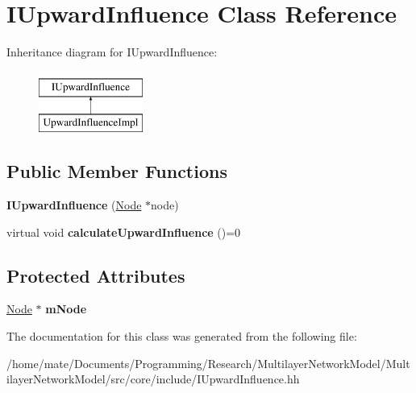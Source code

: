 \hypertarget{classIUpwardInfluence}{}\section{I\+Upward\+Influence Class Reference}
\label{classIUpwardInfluence}
Inheritance diagram for I\+Upward\+Influence\+:\begin{figure}[H]
\begin{center}
\leavevmode
\includegraphics[height=2.000000cm]{classIUpwardInfluence}
\end{center}
\end{figure}
\subsection*{Public Member Functions}
\begin{DoxyCompactItemize}
\item 
{\bfseries I\+Upward\+Influence} (\hyperlink{classNode}{Node} $\ast$node)\hypertarget{classIUpwardInfluence_adc85bc94bdd2b99e474db59901e1cc7b}{}\label{classIUpwardInfluence_adc85bc94bdd2b99e474db59901e1cc7b}

\item 
virtual void {\bfseries calculate\+Upward\+Influence} ()=0\hypertarget{classIUpwardInfluence_adcb9517abfc35398e212fd47af22fdb0}{}\label{classIUpwardInfluence_adcb9517abfc35398e212fd47af22fdb0}

\end{DoxyCompactItemize}
\subsection*{Protected Attributes}
\begin{DoxyCompactItemize}
\item 
\hyperlink{classNode}{Node} $\ast$ {\bfseries m\+Node}\hypertarget{classIUpwardInfluence_aba560a3989e018d2526b14ad91d52ea4}{}\label{classIUpwardInfluence_aba560a3989e018d2526b14ad91d52ea4}

\end{DoxyCompactItemize}


The documentation for this class was generated from the following file\+:\begin{DoxyCompactItemize}
\item 
/home/mate/\+Documents/\+Programming/\+Research/\+Multilayer\+Network\+Model/\+Multilayer\+Network\+Model/src/core/include/I\+Upward\+Influence.\+hh\end{DoxyCompactItemize}
